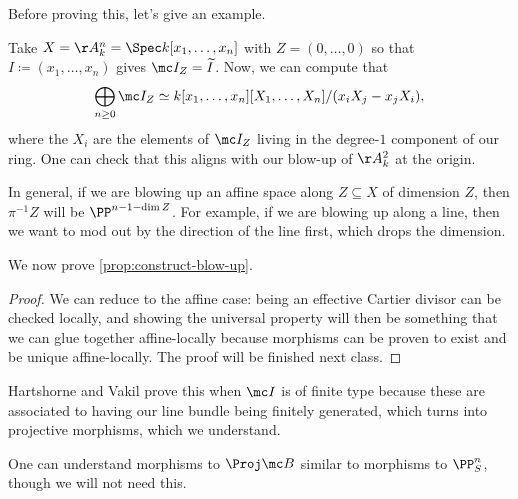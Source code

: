 \documentclass[../notes.tex]{subfiles}
\begin{document}
Before proving this, let's give an example.
\begin{example}
	Take $X=\AA^n_k=\Spec k[x_1,\ldots,x_n]$ with $Z=(0,\ldots,0)$ so that $I\coloneqq(x_1,\ldots,x_n)$ gives $\mc I_Z=\widetilde I$. Now, we can compute that
	\[\bigoplus_{n\ge0}\mc I_Z\simeq k[x_1,\ldots,x_n][X_1,\ldots,X_n]/(x_iX_j-x_jX_i),\]
	where the $X_i$ are the elements of $\mc I_Z$ living in the degree-$1$ component of our ring. One can check that this aligns with our blow-up of $\AA^2_k$ at the origin.
\end{example}
\begin{remark}
	In general, if we are blowing up an affine space along $Z\subseteq X$ of dimension $Z$, then $\pi^{-1}Z$ will be $\PP^{n-1-\dim Z}$. For example, if we are blowing up along a line, then we want to mod out by the direction of the line first, which drops the dimension.
\end{remark}
We now prove \autoref{prop:construct-blow-up}.
\begin{proof}
	We can reduce to the affine case: being an effective Cartier divisor can be checked locally, and showing the universal property will then be something that we can glue together affine-locally because morphisms can be proven to exist and be unique affine-locally. The proof will be finished next class.
\end{proof}
\begin{remark}
	Hartshorne and Vakil prove this when $\mc I$ is of finite type because these are associated to having our line bundle being finitely generated, which turns into projective morphisms, which we understand.
\end{remark}
\begin{remark}
	One can understand morphisms to $\Proj\mc B$ similar to morphisms to $\PP^n_S$, though we will not need this.
\end{remark}
\end{document}
